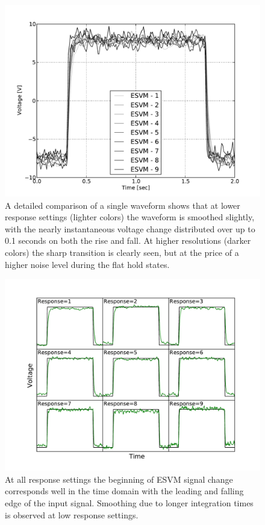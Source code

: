 \begin{figure}
\includegraphics[width=30pc]{chap_electrical/ESVM_Calibration_Pulse.pdf}
\caption{A detailed comparison of a single waveform shows that at lower response settings (lighter colors) the waveform is smoothed slightly, with the nearly instantaneous voltage change distributed over up to 0.1 seconds on both the rise and fall.  At higher resolutions (darker colors) the sharp transition is clearly seen, but at the price of a higher noise level during the flat hold states.}
\label{esvm_response}
\end{figure}

\clearpage

\begin{figure}
\includegraphics[width=30pc]{chap_electrical/ESVM_Allchan_timing.pdf}
\caption{At all response settings the beginning of ESVM signal change corresponds well in the time domain with the leading and falling edge of the input signal.  Smoothing due to longer integration times is observed at low response settings.}
\label{esvm_timing}
\end{figure}


